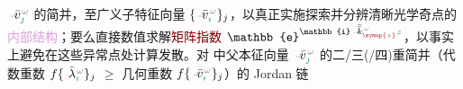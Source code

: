 $\Xint{\begin{smallmatrix} ~ \\ {}^{}_{\mathcolor{gray}{-}} \\ ~ \end{smallmatrix}}{15}{\bar{v}}^{\;\!\mathcolor{gray}{\omega}}_{\textcolor{PineGreen}{\jmath}}$ 的简并，至广义子\textcolor{PineGreen}{特征向量} $\{\Xint{\begin{smallmatrix} ~ \\ {}^{}_{\mathcolor{gray}{-}} \\ ~ \end{smallmatrix}}{15}{\bar{v}}^{\;\!\mathcolor{gray}{\omega}}_{\textcolor{PineGreen}{\imath}}\}_j$，以真正实施探索并分辨清晰\textcolor{PineGreen}{光学奇点}的\textcolor{Plum}{内部结构}；要么直接数值求解\textcolor{Maroon}{矩阵指数} $\mathbb{e}^{\mathbb{i} \Xint{\begin{smallmatrix} ~ \\ {}^{}_{\mathcolor{gray}{-}} \\ ~ \end{smallmatrix}}{15}{\bar{\bar{k}}}_{\textcolor{Maroon}{\symup{z}}}^{\;\! \mathcolor{gray}{\omega}} \mathcolor{gray}{z}}$\cite{zarifiPlaneWaveReflection2014,pessoaAvoidingMatrixExponentials2024}，以事实上避免在这些\textcolor{PineGreen}{异常点}处计算发散。对  中父\textcolor{PineGreen}{本征向量} $\Xint{\begin{smallmatrix} ~ \\ {}^{}_{\mathcolor{gray}{-}} \\ ~ \end{smallmatrix}}{15}{\bar{v}}^{\;\!\mathcolor{gray}{\omega}}_{\textcolor{PineGreen}{\jmath}}$ 的二/三(/四)重简并（代数重数 $f\{\Xint{\begin{smallmatrix} ~ \\ {}^{}_{\mathcolor{gray}{-}} \\ ~ \end{smallmatrix}}{22}{\bar{\lambda}}^{\;\!\mathcolor{gray}{\omega}}_{\textcolor{PineGreen}{\imath}}\}_j$ $\geq$ 几何重数 $f\{\Xint{\begin{smallmatrix} ~ \\ {}^{}_{\mathcolor{gray}{-}} \\ ~ \end{smallmatrix}}{15}{\bar{v}}^{\;\!\mathcolor{gray}{\omega}}_{\textcolor{PineGreen}{\imath}}\}_j$）的 \textcolor{PineGreen}{Jordan 链} 
